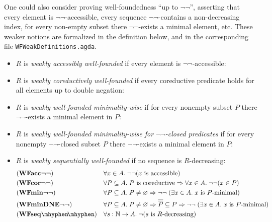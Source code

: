 One could also consider proving well-foundedness ``up to $\lnot\lnot$'',
asserting that every element is $\lnot\lnot$-accessible,
every sequence $\lnot\lnot$-contains a non-decreasing index,
for every non-empty subset there $\lnot\lnot$-exists a minimal element, etc.
These weaker notions are formalized in the definition below, and in the corresponding file
\texttt{WFWeakDefinitions.agda}.

\begin{definition} \label{def:WFweakproperties} \hfill
  \begin{itemize}
    \item $R$ is \emph{weakly accessibly well-founded} if every element is $\lnot\lnot$-accessible: %
    \item $R$ is \emph{weakly coreductively well-founded} if every coreductive predicate holds for all elements up to double negation:
    \item  $R$ is \emph{weakly well-founded minimality-wise} if for every nonempty subset $P$ there $\lnot \lnot$-exists a minimal element in $P$:
    \item  $R$ is \emph{weakly well-founded minimality-wise for $\lnot \lnot$-closed predicates} if for every nonempty $\lnot \lnot$-closed subset $P$ there $\lnot \lnot$-exists a minimal element in $P$:
    \item $R$ is \emph{weakly sequentially well-founded} if no sequence is $R$-decreasing:
      \begin{align*}
       &(\WFaccm) &&\forall x \in A.\; \lnot \lnot  (x \text{ is accessible}) \\
       &(\WFcorm)  &&\forall P \subseteq A.\;\text{$P$ is coreductive} \Rightarrow \forall x \in A.\; \lnot\lnot(x \in P)\\
       &(\WFminm) &&\forall P \subseteq A.\; P \neq \varnothing \Rightarrow \lnot \lnot \;
        (\exists x \in A.\; \text{$x$ is $P$-minimal})\\
       &(\WFminDNEm) &&\forall P \subseteq A.\; P \neq \varnothing \Rightarrow \ol{\ol P} \subseteq P\Rightarrow \lnot \lnot \;
        (\exists x \in A.\; \text{$x$ is $P$-minimal})\\
       &(\WFseqm) &&\forall s:\nat \to A.\; \lnot \text{($s$ is $R$-decreasing)}
      \end{align*}
\end{itemize}
\end{definition}


